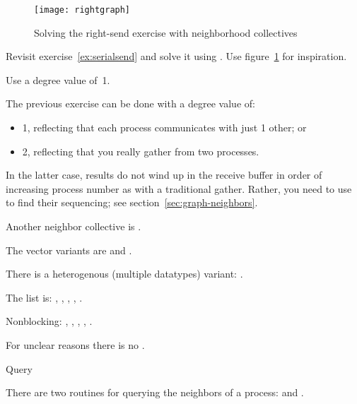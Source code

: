 \begin{figure}[ht]
  \texttt{[image: rightgraph]}
  \caption{Solving the right-send exercise with neighborhood
    collectives}
  \label{fig:rightgraph}
\end{figure}

\begin{exercise}
  \label{ex:rightgraph}
  Revisit exercise~\ref{ex:serialsend} and solve it using
  .
  Use figure~\ref{fig:rightgraph} for inspiration.

  Use a degree value of~1.
\end{exercise}

The previous exercise can be done with a degree value of:
\begin{itemize}
\item 1, reflecting that each process communicates with just 1 other; or
\item 2, reflecting that you really gather from two processes.
\end{itemize}
In the latter case, results do not wind up in the receive buffer
in order of increasing process number as with a traditional gather.
Rather, you need to use~
to find their sequencing; see section~\ref{sec:graph-neighbors}.

Another neighbor collective is .

The vector variants are
and
.

There is a heterogenous (multiple datatypes) variant:
.

The list is: ,
,
,
,
.

Nonblocking:
,
,
,
,
.

For unclear reasons there is no .

 {Query}
\label{sec:graph-neighbors}

There are two routines for querying the neighbors of a process:
%
and
.

